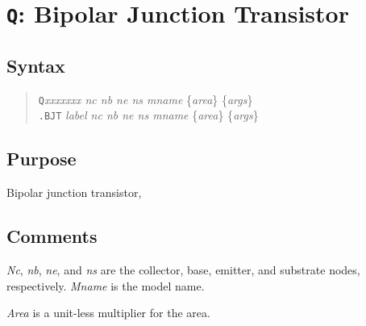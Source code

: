 %
%
%
%
\section{{\tt Q}: Bipolar Junction Transistor}
\subsection{Syntax}
\begin{verse}
{\tt Q}{\it xxxxxxx nc nb ne ns mname} \{{\it area}\} \{{\it args}\}\\
{\tt .BJT} {\it label nc nb ne ns mname} \{{\it area}\} \{{\it args}\}
\end{verse}
\subsection{Purpose}

Bipolar junction transistor,
\subsection{Comments}

{\it Nc}, {\it nb}, {\it ne}, and {\it ns} are the collector, base,
emitter, and substrate nodes, respectively.  {\it Mname} is the model
name.

{\it Area} is a unit-less multiplier for the area.

